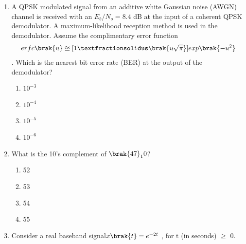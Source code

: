\begin{enumerate}[label=\thesubsection.\arabic*,ref=\thesubsection.\theenumi]
Let$ E[x\brak{t}] = \int_{-\infty}^{\infty}x\brak{t}]2 dt$.
Which of the following options correctly represents the ratio,
$E[x\brak{t}]⁄E[3x\brak{-3t + 5}]$?
\begin{multicols}{4}
	\begin{enumerate}
		\item 3
		\item 1
		\item $\frac{1}{3}$
		\item $\frac{1}{9}$
	\end{enumerate}
\end{multicols}
\item A QPSK modulated signal from an additive white Gaussian noise (AWGN) channel is received with an $E_b/N_o = 8.4$ dB at the input of a coherent QPSK demodulator. A maximum-likelihood reception method is used in the
demodulator.
Assume the complimentary error function
\begin{align*}
	e rfc\brak{u} \approxeq [1⁄\brak{u\sqrt{\pi}}]exp\brak{-u^2}
\end{align*}.
Which is the nearest bit error rate (BER) at the output of the demodulator?
\begin{multicols}{4}
	\begin{enumerate}
		\item $10^{-3}$
		\item $10^{-4}$
		\item $10^{-5}$
		\item $10^{-6}$
	\end{enumerate}
\end{multicols}
\item What is the 10's complement of $\brak{47}_10$?
	\begin{multicols}{4}
		\begin{enumerate}
			\item 52
			\item 53
			\item 54
			\item 55
		\end{enumerate}
	\end{multicols}
\item Consider a real baseband signal$x\brak{t} =e^{-2t}$ , for t (in seconds) $\geq$ 0.

\end{enumerate}

